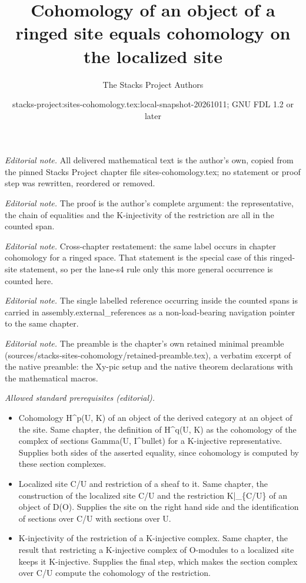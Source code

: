 \documentclass[10pt,a4paper]{amsart}
\title{Cohomology of an object of a ringed site equals cohomology on the localized site}
\author{The Stacks Project Authors}
\date{stacks-project:sites-cohomology.tex:local-snapshot-20261011; GNU FDL 1.2 or later}
\theoremstyle{plain}
\theoremstyle{definition}
\theoremstyle{remark}
\numberwithin{equation}{subsection}
\begin{document}
\maketitle
\noindent\textit{Editorial note.} All delivered mathematical text is the author's own, copied from the pinned Stacks Project chapter file sites-cohomology.tex; no statement or proof step was rewritten, reordered or removed.\par\medskip
\noindent\textit{Editorial note.} The proof is the author's complete argument: the representative, the chain of equalities and the K-injectivity of the restriction are all in the counted span.\par\medskip
\noindent\textit{Editorial note.} Cross-chapter restatement: the same label occurs in chapter cohomology for a ringed space. That statement is the special case of this ringed-site statement, so per the lane-s4 rule only this more general occurrence is counted here.\par\medskip
\noindent\textit{Editorial note.} The single labelled reference occurring inside the counted spans is carried in assembly.external\_references as a non-load-bearing navigation pointer to the same chapter.\par\medskip
\noindent\textit{Editorial note.} The preamble is the chapter's own retained minimal preamble (sources/stacks-sites-cohomology/retained-preamble.tex), a verbatim excerpt of the native preamble: the Xy-pic setup and the native theorem declarations with the mathematical macros.\par\medskip
\noindent\textit{Allowed standard prerequisites (editorial).}\begin{itemize}
\item Cohomology H\textasciicircum{}p(U, K) of an object of the derived category at an object of the site. Same chapter, the definition of H\textasciicircum{}q(U, K) as the cohomology of the complex of sections Gamma(U, I\textasciicircum{}bullet) for a K-injective representative. Supplies both sides of the asserted equality, since cohomology is computed by these section complexes.
\item Localized site C/U and restriction of a sheaf to it. Same chapter, the construction of the localized site C/U and the restriction K|\_\{C/U\} of an object of D(O). Supplies the site on the right hand side and the identification of sections over C/U with sections over U.
\item K-injectivity of the restriction of a K-injective complex. Same chapter, the result that restricting a K-injective complex of O-modules to a localized site keeps it K-injective. Supplies the final step, which makes the section complex over C/U compute the cohomology of the restriction.
\end{itemize}\medskip
\end{document}
